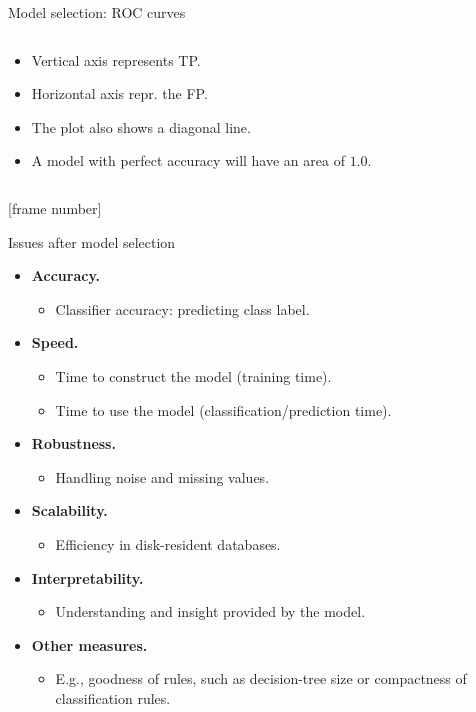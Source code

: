 \documentclass[aspectratio=169,t,table]{beamer}
\begin{document}
{\begin{frame}{Model selection: ROC curves}
\begin{columns}
\begin{column}{0.4\textwidth}
          \begin{itemize}
            \item Vertical axis represents TP.
            \item Horizontal axis repr. the FP.
            \item The plot also shows a diagonal line.
            \item A model with perfect accuracy will have an area of $1.0$.
          \end{itemize}
        \end{column}
      \end{columns}
    \end{frame}
  }

  {
    [frame number]
    \begin{frame}{Issues after model selection}
      \begin{itemize}
        \item \textbf{Accuracy.}
        \begin{itemize}
          \item Classifier accuracy: predicting class label.
        \end{itemize}
        \item \textbf{Speed.}
        \begin{itemize}
          \item Time to construct the model (training time).
          \item Time to use the model (classification/prediction time).
        \end{itemize}
        \item \textbf{Robustness.}
        \begin{itemize}
          \item Handling noise and missing values.
        \end{itemize}
        \item \textbf{Scalability.}
        \begin{itemize}
          \item Efficiency in disk-resident databases.
        \end{itemize}
        \item \textbf{Interpretability.}
        \begin{itemize}
          \item Understanding and insight provided by the model.
        \end{itemize}
        \item \textbf{Other measures.}
        \begin{itemize}
          \item E.g., goodness of rules, such as decision-tree size or compactness of classification rules.
        \end{itemize}
      \end{itemize}
    \end{frame}
  }
\end{document}
